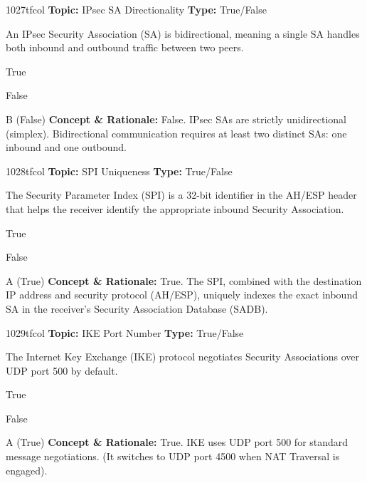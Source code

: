 \begin{qcard}{1027}{tfcol}
\textcolor{darkslate!75}{\small\textbf{Topic:} IPsec SA Directionality \hfill \textbf{Type:} True/False}\vspace{0.4em}\par
An IPsec Security Association (SA) is bidirectional, meaning a single SA handles both inbound and outbound traffic between two peers.
\begin{qoptions}
\item True
\item False
\end{qoptions}
\end{qcard}
\nopagebreak
\begin{explainbox}{B (False)}
\textbf{Concept \& Rationale:} False. IPsec SAs are strictly unidirectional (simplex). Bidirectional communication requires at least two distinct SAs: one inbound and one outbound.
\end{explainbox}

\begin{qcard}{1028}{tfcol}
\textcolor{darkslate!75}{\small\textbf{Topic:} SPI Uniqueness \hfill \textbf{Type:} True/False}\vspace{0.4em}\par
The Security Parameter Index (SPI) is a 32-bit identifier in the AH/ESP header that helps the receiver identify the appropriate inbound Security Association.
\begin{qoptions}
\item True
\item False
\end{qoptions}
\end{qcard}
\nopagebreak
\begin{explainbox}{A (True)}
\textbf{Concept \& Rationale:} True. The SPI, combined with the destination IP address and security protocol (AH/ESP), uniquely indexes the exact inbound SA in the receiver's Security Association Database (SADB).
\end{explainbox}

\begin{qcard}{1029}{tfcol}
\textcolor{darkslate!75}{\small\textbf{Topic:} IKE Port Number \hfill \textbf{Type:} True/False}\vspace{0.4em}\par
The Internet Key Exchange (IKE) protocol negotiates Security Associations over UDP port 500 by default.
\begin{qoptions}
\item True
\item False
\end{qoptions}
\end{qcard}
\nopagebreak
\begin{explainbox}{A (True)}
\textbf{Concept \& Rationale:} True. IKE uses UDP port 500 for standard message negotiations. (It switches to UDP port 4500 when NAT Traversal is engaged).
\end{explainbox}

